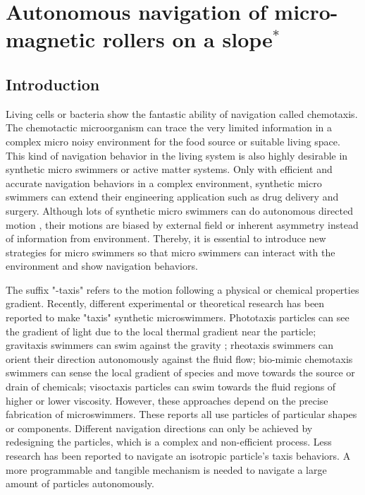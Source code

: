 \chapter{Autonomous navigation of micro-magnetic rollers on a slope$^{*}$} 
\section{Introduction}
Living cells or bacteria show the fantastic ability of navigation called chemotaxis.\autocite{alon1999robustness,adler1975chemotaxis} The chemotactic microorganism can trace the very limited information in  a complex micro noisy environment for the food source or suitable living space.\autocite{keller1971model} This kind of navigation behavior in the living system is also highly desirable in synthetic micro swimmers or active matter systems. \autocite{patteson2016active} Only with efficient and accurate navigation behaviors in a complex environment, synthetic micro swimmers can extend their engineering application  such as drug delivery and surgery.\autocite{de2017micromotor,xu2018sperm} Although lots of synthetic  micro swimmers can do autonomous directed motion \autocite{yan2016reconfiguring,dou2016directed,lee2019directed,baker2019shape}, their motions are biased by  external field or inherent asymmetry instead of information from environment. Thereby, it is essential to introduce new strategies for micro swimmers so that micro swimmers can interact with the environment and show navigation behaviors.  

The suffix "-taxis" refers to the motion following a physical or chemical properties gradient. Recently, different experimental or theoretical research has been reported to make "taxis" synthetic microswimmers. Phototaxis particles can see the gradient of light due to the local thermal gradient near the particle\autocite{yu2019phototaxis,dai2016programmable,lozano2016phototaxis,chen2017light}; gravitaxis swimmers can swim against the gravity \autocite{campbell2013gravitaxis,ten2014gravitaxis}; rheotaxis swimmers can orient their direction autonomously against the fluid flow\autocite{Palacci2015,ren2017rheotaxis,brosseau2019relating}; bio-mimic chemotaxis swimmers can sense the local gradient of species and move towards the source or drain of chemicals\autocite{dou2019autonomous}; visoctaxis particles can swim towards the fluid regions of higher or lower viscosity\autocite{liebchen2018viscotaxis}. However, these approaches depend on the precise fabrication of microswimmers.
These reports all use particles of particular shapes or components. Different navigation directions can only be achieved by redesigning the particles, which is a complex and non-efficient process. Less research has been reported to navigate an isotropic particle's taxis behaviors. A more programmable and tangible mechanism is needed to navigate a large amount of particles autonomously. \autocite{dou2019autonomous}

